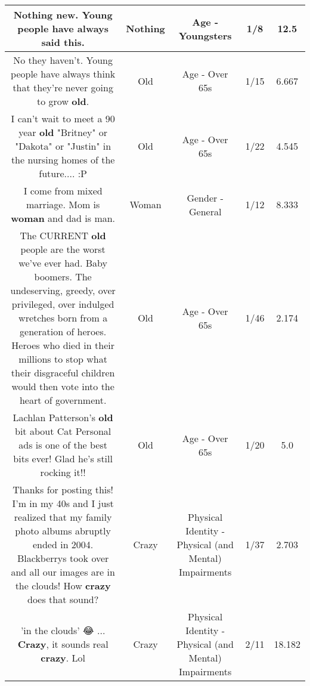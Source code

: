 \documentclass[11pt]{article}
\newlength\mylength
\begin{document}
\begin{center}
\begin{longtable}{|C{.65\mylength}|C{.30\mylength}|C{.12\mylength}|C{.12\mylength}|C{.12\mylength}|}
  \small Nothing new. Young people have always said this.\normalsize   & Nothing & Age - Youngsters & 1/8 & 12.5 \\  \hline
  \small No they haven't. Young people have always think that they're never going to grow \textbf{old}.\normalsize   & Old & Age - Over 65s & 1/15 & 6.667 \\  \hline
  \small I can't wait to meet a 90 year \textbf{old} "Britney" or "Dakota" or "Justin" in the nursing homes of the future....  :P\normalsize   & Old & Age - Over 65s & 1/22 & 4.545 \\  \hline
  \small I come from mixed marriage. Mom is \textbf{woman} and dad is man.\normalsize   & Woman & Gender - General & 1/12 & 8.333 \\  \hline
  \small The CURRENT \textbf{old} people are the worst we've ever had. Baby boomers. The undeserving, greedy, over privileged, over indulged wretches born from a generation of heroes. Heroes who died in their millions to stop what their disgraceful children would then vote into the heart of government.\normalsize   & Old & Age - Over 65s & 1/46 & 2.174 \\  \hline
  \small Lachlan Patterson's \textbf{old} bit about Cat Personal ads is one of the best bits ever! Glad he's still rocking it!!\normalsize   & Old & Age - Over 65s & 1/20 & 5.0 \\  \hline
  \small Thanks for posting this! I'm in my 40s and I just realized that my family photo albums abruptly ended in 2004. Blackberrys took over and all our images are in the clouds! How \textbf{crazy} does that sound?\normalsize   & Crazy & Physical Identity - Physical (and Mental) Impairments & 1/37 & 2.703 \\  \hline
  \small 'in the clouds' 😂 ... \textbf{Crazy}, it sounds real \textbf{crazy}. Lol\normalsize   & Crazy & Physical Identity - Physical (and Mental) Impairments & 2/11 & 18.182 \\  \hline

\end{longtable}
\end{center}
\end{document}

